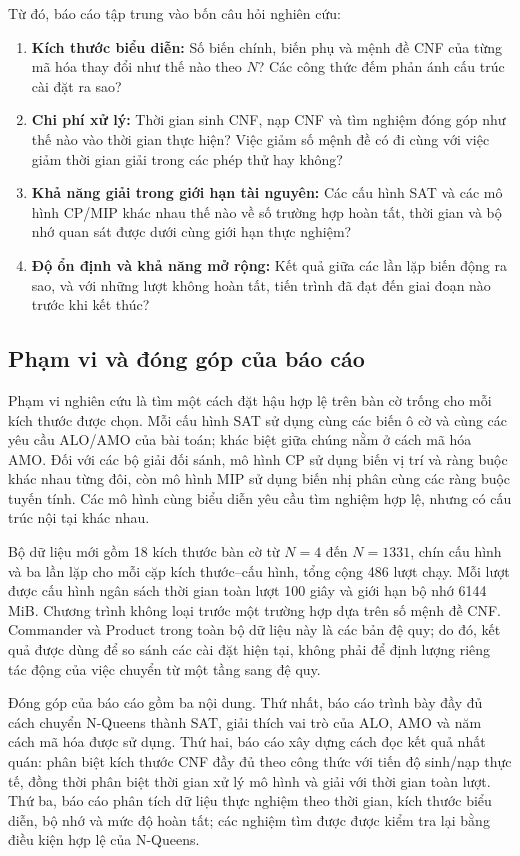 Từ đó, báo cáo tập trung vào bốn câu hỏi nghiên cứu:
\begin{enumerate}
    \item \textbf{Kích thước biểu diễn:} Số biến chính, biến phụ và mệnh đề CNF của từng mã hóa thay đổi như thế nào theo $N$? Các công thức đếm phản ánh cấu trúc cài đặt ra sao?
    \item \textbf{Chi phí xử lý:} Thời gian sinh CNF, nạp CNF và tìm nghiệm đóng góp như thế nào vào thời gian thực hiện? Việc giảm số mệnh đề có đi cùng với việc giảm thời gian giải trong các phép thử hay không?
    \item \textbf{Khả năng giải trong giới hạn tài nguyên:} Các cấu hình SAT và các mô hình CP/MIP khác nhau thế nào về số trường hợp hoàn tất, thời gian và bộ nhớ quan sát được dưới cùng giới hạn thực nghiệm?
    \item \textbf{Độ ổn định và khả năng mở rộng:} Kết quả giữa các lần lặp biến động ra sao, và với những lượt không hoàn tất, tiến trình đã đạt đến giai đoạn nào trước khi kết thúc?
\end{enumerate}

\subsection{Phạm vi và đóng góp của báo cáo}

Phạm vi nghiên cứu là tìm một cách đặt hậu hợp lệ trên bàn cờ trống cho mỗi kích thước được chọn. Mỗi cấu hình SAT sử dụng cùng các biến ô cờ và cùng các yêu cầu ALO/AMO của bài toán; khác biệt giữa chúng nằm ở cách mã hóa AMO. Đối với các bộ giải đối sánh, mô hình CP sử dụng biến vị trí và ràng buộc khác nhau từng đôi, còn mô hình MIP sử dụng biến nhị phân cùng các ràng buộc tuyến tính. Các mô hình cùng biểu diễn yêu cầu tìm nghiệm hợp lệ, nhưng có cấu trúc nội tại khác nhau.

Bộ dữ liệu mới gồm 18 kích thước bàn cờ từ $N=4$ đến $N=1331$, chín cấu hình và ba lần lặp cho mỗi cặp kích thước--cấu hình, tổng cộng 486 lượt chạy. Mỗi lượt được cấu hình ngân sách thời gian toàn lượt 100 giây và giới hạn bộ nhớ 6144 MiB. Chương trình không loại trước một trường hợp dựa trên số mệnh đề CNF. Commander và Product trong toàn bộ dữ liệu này là các bản đệ quy; do đó, kết quả được dùng để so sánh các cài đặt hiện tại, không phải để định lượng riêng tác động của việc chuyển từ một tầng sang đệ quy.

Đóng góp của báo cáo gồm ba nội dung. Thứ nhất, báo cáo trình bày đầy đủ cách chuyển N-Queens thành SAT, giải thích vai trò của ALO, AMO và năm cách mã hóa được sử dụng. Thứ hai, báo cáo xây dựng cách đọc kết quả nhất quán: phân biệt kích thước CNF đầy đủ theo công thức với tiến độ sinh/nạp thực tế, đồng thời phân biệt thời gian xử lý mô hình và giải với thời gian toàn lượt. Thứ ba, báo cáo phân tích dữ liệu thực nghiệm theo thời gian, kích thước biểu diễn, bộ nhớ và mức độ hoàn tất; các nghiệm tìm được được kiểm tra lại bằng điều kiện hợp lệ của N-Queens.

